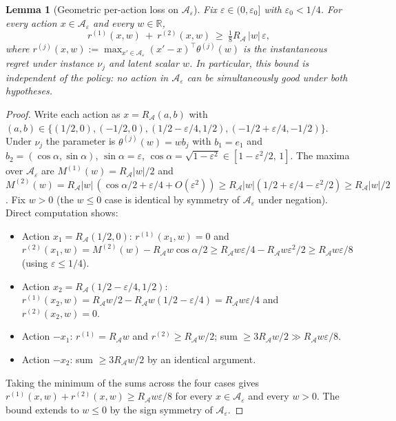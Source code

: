 \documentclass[11pt]{article}
\newcommand{\R}{\mathbb{R}}
\newcommand{\cA}{\mathcal{A}}
\newtheorem{lemma}{Lemma}
\begin{document}
\begin{lemma}[Geometric per-action loss on $\cA_\varepsilon$]
\label{lem:hp_geometric_action_loss}
Fix $\varepsilon\in(0,\varepsilon_0]$ with $\varepsilon_0<1/4$.  For every action
$x\in\cA_\varepsilon$ and every $w\in\R$,
\[
  r^{(1)}(x,w)\ +\ r^{(2)}(x,w)\ \ge\ \tfrac{1}{8}R_{\cA}\,|w|\,\varepsilon,
\]
where $r^{(j)}(x,w):=\max_{x'\in\cA_\varepsilon}(x'-x)^\top\theta^{(j)}(w)$ is the
instantaneous regret under instance $\nu_j$ and latent scalar $w$.
In particular, this bound is independent of the policy: no action in
$\cA_\varepsilon$ can be simultaneously good under both hypotheses.
\end{lemma}

\begin{proof}
Write each action as $x=R_{\cA}(a,b)$ with $(a,b)\in\{(1/2,0),(-1/2,0),
(1/2-\varepsilon/4,1/2),(-1/2+\varepsilon/4,-1/2)\}$.
Under $\nu_j$ the parameter is $\theta^{(j)}(w)=wb_j$ with $b_1=e_1$ and
$b_2=(\cos\alpha,\sin\alpha)$, $\sin\alpha=\varepsilon$,
$\cos\alpha=\sqrt{1-\varepsilon^2}\in[1-\varepsilon^2/2,\,1]$.
The maxima over $\cA_\varepsilon$ are
$M^{(1)}(w)=R_{\cA}|w|/2$ and
$M^{(2)}(w)=R_{\cA}|w|\,(\cos\alpha/2+\varepsilon/4+O(\varepsilon^2))
\ge R_{\cA}|w|(1/2+\varepsilon/4-\varepsilon^2/2)\ge R_{\cA}|w|/2$.
Fix $w>0$ (the $w\le 0$ case is identical by symmetry of $\cA_\varepsilon$
under negation).
Direct computation shows:
\begin{itemize}[leftmargin=1em,nosep]
\item Action $x_1=R_{\cA}(1/2,0)$: $r^{(1)}(x_1,w)=0$ and
$r^{(2)}(x_1,w)=M^{(2)}(w)-R_{\cA}w\cos\alpha/2
\ge R_{\cA}w\varepsilon/4-R_{\cA}w\varepsilon^2/2\ge R_{\cA}w\varepsilon/8$
(using $\varepsilon\le 1/4$).
\item Action $x_2=R_{\cA}(1/2-\varepsilon/4,1/2)$:
$r^{(1)}(x_2,w)=R_{\cA}w/2-R_{\cA}w(1/2-\varepsilon/4)=R_{\cA}w\varepsilon/4$
and $r^{(2)}(x_2,w)=0$.
\item Action $-x_1$: $r^{(1)}=R_{\cA}w$ and $r^{(2)}\ge R_{\cA}w/2$; sum
$\ge 3R_{\cA}w/2\gg R_{\cA}w\varepsilon/8$.
\item Action $-x_2$: sum $\ge 3R_{\cA}w/2$ by an identical argument.
\end{itemize}
Taking the minimum of the sums across the four cases gives
$r^{(1)}(x,w)+r^{(2)}(x,w)\ge R_{\cA}w\varepsilon/8$ for every
$x\in\cA_\varepsilon$ and every $w>0$.  The bound extends to $w\le 0$ by
the sign symmetry of $\cA_\varepsilon$.
\end{proof}
\end{document}
